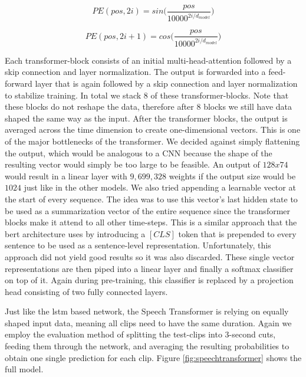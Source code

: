 \begin{equation}\label{eq:pe_even}
    PE(pos, 2i) = sin\Big(\frac{pos}{10000^{2i/d_{model}}}\Big)
\end{equation}

\begin{equation}\label{eq:pe_uneven}
    PE(pos, 2i+1) = cos\Big(\frac{pos}{10000^{2i/d_{model}}}\Big)
\end{equation}

Each transformer-block consists of an initial multi-head-attention followed by a skip connection and layer normalization. The output is forwarded into a feed-forward layer that is again followed by a skip connection and layer normalization to stabilize training. In total we stack 8 of these transformer-blocks. Note that these blocks do not reshape the data, therefore after 8 blocks we still have data shaped the same way as the input. After the transformer blocks, the output is averaged across the time dimension to create one-dimensional vectors. This is one of the major bottlenecks of the transformer. We decided against simply flattening the output, which would be analogous to a CNN because the shape of the resulting vector would simply be too large to be feasible. An output of $128 x 74$ would result in a linear layer with $9,699,328$ weights if the output size would be $1024$ just like in the other models. We also tried appending a learnable vector at the start of every sequence. The idea was to use this vector's last hidden state to be used as a summarization vector of the entire sequence since the transformer blocks make it attend to all other time-steps. This is a similar approach that the \gls{bert} architecture \cite{devlin2019bert} uses by introducing a $[CLS]$ token that is prepended to every sentence to be used as a sentence-level representation. Unfortunately, this approach did not yield good results so it was also discarded. These single vector representations are then piped into a linear layer and finally a softmax classifier on top of it. Again during pre-training, this classifier is replaced by a projection head consisting of two fully connected layers.

Just like the \gls{lstm} based network, the Speech Transformer is relying on equally shaped input data, meaning all clips need to have the same duration. Again we employ the evaluation method of splitting the test-clips into 3-second cuts, feeding them through the network, and averaging the resulting probabilities to obtain one single prediction for each clip. Figure \ref{fig:speechtransformer} shows the full model.


